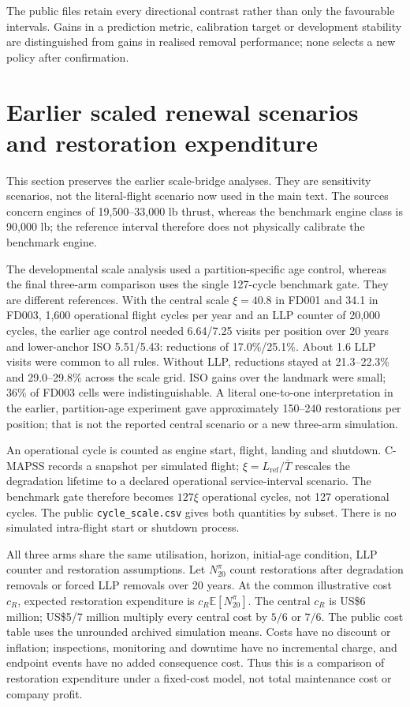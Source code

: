 \documentclass[12pt]{article}
\begin{document}
The public files retain every directional contrast rather than only the favourable intervals. Gains in a prediction metric, calibration target or development stability are distinguished from gains in realised removal performance; none selects a new policy after confirmation.

\section{Earlier scaled renewal scenarios and restoration expenditure}

This section preserves the earlier scale-bridge analyses. They are sensitivity scenarios, not the literal-flight scenario now used in the main text. The sources concern engines of 19,500--33,000 lb thrust, whereas the benchmark engine class is 90,000 lb; the reference interval therefore does not physically calibrate the benchmark engine.

The developmental scale analysis used a partition-specific age control, whereas the final three-arm comparison uses the single 127-cycle benchmark gate. They are different references. With the central scale $\xi=40.8$ in FD001 and 34.1 in FD003, 1,600 operational flight cycles per year and an LLP counter of 20,000 cycles, the earlier age control needed 6.64/7.25 visits per position over 20 years and lower-anchor ISO 5.51/5.43: reductions of 17.0\%/25.1\%. About 1.6 LLP visits were common to all rules. Without LLP, reductions stayed at 21.3--22.3\% and 29.0--29.8\% across the scale grid. ISO gains over the landmark were small; 36\% of FD003 cells were indistinguishable. A literal one-to-one interpretation in the earlier, partition-age experiment gave approximately 150--240 restorations per position; that is not the reported central scenario or a new three-arm simulation.

An operational cycle is counted as engine start, flight, landing and shutdown. C-MAPSS records a snapshot per simulated flight; $\xi=L_{\mathrm{ref}}/\bar T$ rescales the degradation lifetime to a declared operational service-interval scenario. The benchmark gate therefore becomes $127\xi$ operational cycles, not 127 operational cycles. The public \texttt{cycle\_scale.csv} gives both quantities by subset. There is no simulated intra-flight start or shutdown process.

All three arms share the same utilisation, horizon, initial-age condition, LLP counter and restoration assumptions. Let $N^{\pi}_{20}$ count restorations after degradation removals or forced LLP removals over 20 years. At the common illustrative cost $c_R$, expected restoration expenditure is $c_R\mathbb E[N^{\pi}_{20}]$. The central $c_R$ is US\$6 million; US\$5/7 million multiply every central cost by $5/6$ or $7/6$. The public cost table uses the unrounded archived simulation means. Costs have no discount or inflation; inspections, monitoring and downtime have no incremental charge, and endpoint events have no added consequence cost. Thus this is a comparison of restoration expenditure under a fixed-cost model, not total maintenance cost or company profit.
\end{document}
